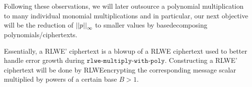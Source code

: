 \documentclass[letterpaper,10pt,english]{jupyterBook}
\begin{document}
\sphinxAtStartPar
Following these observations, we will later outsource a polynomial multiplication to many individual monomial multiplications and in particular, our next objective will be the reduction of \(\left\lvert\left\lvert p \right\rvert\right\rvert_\infty\) to smaller values by base\sphinxhyphen{}decomposing polynomials/ciphertexts.

\begin{DUlineblock}{0em}
\item[] 
\end{DUlineblock}

\begin{DUlineblock}{0em}
\item[] 
\end{DUlineblock}

\sphinxAtStartPar
Essentially, a RLWE’ ciphertext is a blow\sphinxhyphen{}up of a RLWE ciphertext used to better handle error growth during \(\texttt{rlwe-multiply-with-poly}\).
Constructing a RLWE’ ciphertext will be done by RLWE\sphinxhyphen{}encrypting the corresponding message scalar multiplied by powers of a certain base \(B > 1\).
\end{document}
